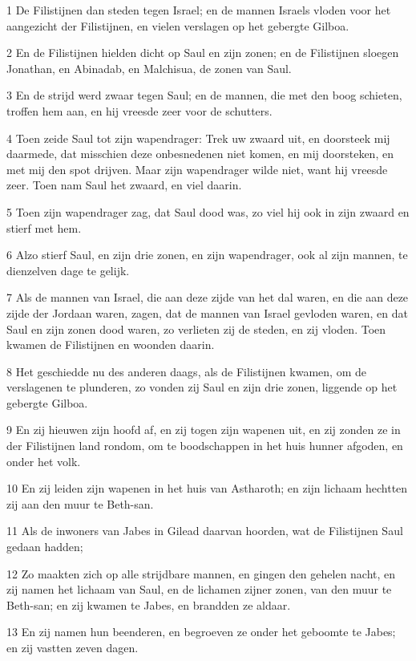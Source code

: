 \par 1 De Filistijnen dan steden tegen Israel; en de mannen Israels vloden voor het aangezicht der Filistijnen, en vielen verslagen op het gebergte Gilboa.
\par 2 En de Filistijnen hielden dicht op Saul en zijn zonen; en de Filistijnen sloegen Jonathan, en Abinadab, en Malchisua, de zonen van Saul.
\par 3 En de strijd werd zwaar tegen Saul; en de mannen, die met den boog schieten, troffen hem aan, en hij vreesde zeer voor de schutters.
\par 4 Toen zeide Saul tot zijn wapendrager: Trek uw zwaard uit, en doorsteek mij daarmede, dat misschien deze onbesnedenen niet komen, en mij doorsteken, en met mij den spot drijven. Maar zijn wapendrager wilde niet, want hij vreesde zeer. Toen nam Saul het zwaard, en viel daarin.
\par 5 Toen zijn wapendrager zag, dat Saul dood was, zo viel hij ook in zijn zwaard en stierf met hem.
\par 6 Alzo stierf Saul, en zijn drie zonen, en zijn wapendrager, ook al zijn mannen, te dienzelven dage te gelijk.
\par 7 Als de mannen van Israel, die aan deze zijde van het dal waren, en die aan deze zijde der Jordaan waren, zagen, dat de mannen van Israel gevloden waren, en dat Saul en zijn zonen dood waren, zo verlieten zij de steden, en zij vloden. Toen kwamen de Filistijnen en woonden daarin.
\par 8 Het geschiedde nu des anderen daags, als de Filistijnen kwamen, om de verslagenen te plunderen, zo vonden zij Saul en zijn drie zonen, liggende op het gebergte Gilboa.
\par 9 En zij hieuwen zijn hoofd af, en zij togen zijn wapenen uit, en zij zonden ze in der Filistijnen land rondom, om te boodschappen in het huis hunner afgoden, en onder het volk.
\par 10 En zij leiden zijn wapenen in het huis van Astharoth; en zijn lichaam hechtten zij aan den muur te Beth-san.
\par 11 Als de inwoners van Jabes in Gilead daarvan hoorden, wat de Filistijnen Saul gedaan hadden;
\par 12 Zo maakten zich op alle strijdbare mannen, en gingen den gehelen nacht, en zij namen het lichaam van Saul, en de lichamen zijner zonen, van den muur te Beth-san; en zij kwamen te Jabes, en brandden ze aldaar.
\par 13 En zij namen hun beenderen, en begroeven ze onder het geboomte te Jabes; en zij vastten zeven dagen.



